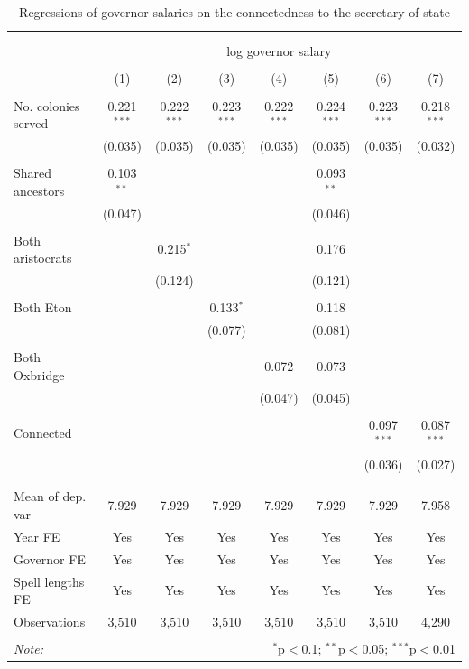 \documentclass[a4paper]{article}\usepackage[]{graphicx}\usepackage[]{xcolor}
\begin{document}
\begin{table}[!htbp] \centering 
  \caption{Regressions of governor salaries on the connectedness to the secretary of state} 
  \label{tab:sal} 
\scriptsize 
\begin{tabular}{@{\extracolsep{5pt}}lccccccc} 
\\[-1.8ex]\hline 
\hline \\[-1.8ex] 
\\[-1.8ex] & \multicolumn{7}{c}{log governor salary} \\ 
\\[-1.8ex] & (1) & (2) & (3) & (4) & (5) & (6) & (7)\\ 
\hline \\[-1.8ex] 
 No. colonies served & 0.221$^{***}$ & 0.222$^{***}$ & 0.223$^{***}$ & 0.222$^{***}$ & 0.224$^{***}$ & 0.223$^{***}$ & 0.218$^{***}$ \\ 
  & (0.035) & (0.035) & (0.035) & (0.035) & (0.035) & (0.035) & (0.032) \\ 
  & & & & & & & \\ 
 Shared ancestors & 0.103$^{**}$ &  &  &  & 0.093$^{**}$ &  &  \\ 
  & (0.047) &  &  &  & (0.046) &  &  \\ 
  & & & & & & & \\ 
 Both aristocrats &  & 0.215$^{*}$ &  &  & 0.176 &  &  \\ 
  &  & (0.124) &  &  & (0.121) &  &  \\ 
  & & & & & & & \\ 
 Both Eton &  &  & 0.133$^{*}$ &  & 0.118 &  &  \\ 
  &  &  & (0.077) &  & (0.081) &  &  \\ 
  & & & & & & & \\ 
 Both Oxbridge &  &  &  & 0.072 & 0.073 &  &  \\ 
  &  &  &  & (0.047) & (0.045) &  &  \\ 
  & & & & & & & \\ 
 Connected &  &  &  &  &  & 0.097$^{***}$ & 0.087$^{***}$ \\ 
  &  &  &  &  &  & (0.036) & (0.027) \\ 
  & & & & & & & \\ 
\hline \\[-1.8ex] 
Mean of dep. var & 7.929 & 7.929 & 7.929 & 7.929 & 7.929 & 7.929 & 7.958 \\ 
Year FE & Yes & Yes & Yes & Yes & Yes & Yes & Yes \\ 
Governor FE & Yes & Yes & Yes & Yes & Yes & Yes & Yes \\ 
Spell lengths FE & Yes & Yes & Yes & Yes & Yes & Yes & Yes \\ 
Observations & 3,510 & 3,510 & 3,510 & 3,510 & 3,510 & 3,510 & 4,290 \\ 
\hline 
\hline \\[-1.8ex] 
\textit{Note:}  & \multicolumn{7}{r}{$^{*}$p$<$0.1; $^{**}$p$<$0.05; $^{***}$p$<$0.01} \\ 
\end{tabular} 
\end{table} 
\end{document}
